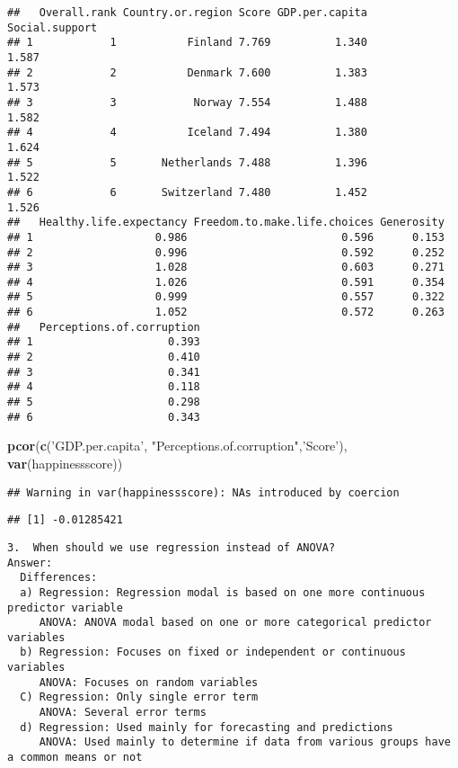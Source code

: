 \documentclass[]{article}
\newenvironment{Shaded}{\begin{snugshade}}{\end{snugshade}}
\newcommand{\KeywordTok}[1]{\textcolor[rgb]{0.13,0.29,0.53}{\textbf{#1}}}
\newcommand{\NormalTok}[1]{#1}
\newcommand{\StringTok}[1]{\textcolor[rgb]{0.31,0.60,0.02}{#1}}
\begin{document}
\begin{verbatim}
##   Overall.rank Country.or.region Score GDP.per.capita Social.support
## 1            1           Finland 7.769          1.340          1.587
## 2            2           Denmark 7.600          1.383          1.573
## 3            3            Norway 7.554          1.488          1.582
## 4            4           Iceland 7.494          1.380          1.624
## 5            5       Netherlands 7.488          1.396          1.522
## 6            6       Switzerland 7.480          1.452          1.526
##   Healthy.life.expectancy Freedom.to.make.life.choices Generosity
## 1                   0.986                        0.596      0.153
## 2                   0.996                        0.592      0.252
## 3                   1.028                        0.603      0.271
## 4                   1.026                        0.591      0.354
## 5                   0.999                        0.557      0.322
## 6                   1.052                        0.572      0.263
##   Perceptions.of.corruption
## 1                     0.393
## 2                     0.410
## 3                     0.341
## 4                     0.118
## 5                     0.298
## 6                     0.343
\end{verbatim}

\begin{Shaded}
\begin{Highlighting}[]
\KeywordTok{pcor}\NormalTok{(}\KeywordTok{c}\NormalTok{(}\StringTok{'GDP.per.capita'}\NormalTok{, }\StringTok{"Perceptions.of.corruption"}\NormalTok{,}\StringTok{'Score'}\NormalTok{), }\KeywordTok{var}\NormalTok{(happinessscore))}
\end{Highlighting}
\end{Shaded}

\begin{verbatim}
## Warning in var(happinessscore): NAs introduced by coercion
\end{verbatim}

\begin{verbatim}
## [1] -0.01285421
\end{verbatim}

\begin{verbatim}
3.  When should we use regression instead of ANOVA?
Answer:
  Differences:
  a) Regression: Regression modal is based on one more continuous predictor variable    
     ANOVA: ANOVA modal based on one or more categorical predictor variables
  b) Regression: Focuses on fixed or independent or continuous variables    
     ANOVA: Focuses on random variables
  C) Regression: Only single error term 
     ANOVA: Several error terms
  d) Regression: Used mainly for forecasting and predictions    
     ANOVA: Used mainly to determine if data from various groups have a common means or not
\end{verbatim}
\end{document}
